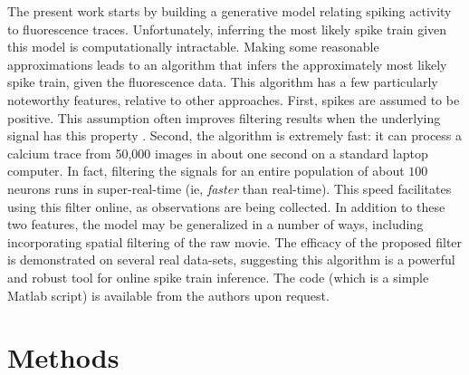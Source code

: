 The present work starts by building a generative model relating spiking activity to fluorescence traces. Unfortunately, inferring the most likely spike train given this model is computationally intractable.  Making some reasonable approximations leads to an algorithm that infers the approximately most likely spike train, given the fluorescence data.  This algorithm has a few particularly noteworthy features, relative to other approaches.  First, spikes are assumed to be positive.  This assumption often improves filtering results when the underlying signal has this property \cite{PortugalVicente94, MarkhamConchello99, LeeSeung99, LLS04, OGradyPearlmutter06, HuysPaninski06, Cunningham08, PaninskiWu09}.  Second, the algorithm is extremely fast: it can process a calcium trace from 50,000 images in about one second on a standard laptop computer. In fact, filtering the signals for an entire population of about $100$ neurons runs in super-real-time (ie, \emph{faster} than real-time). This speed facilitates using this filter online, as observations are being collected. In addition to these two features, the model may be generalized in a number of ways, including incorporating spatial filtering of the raw movie. The efficacy of the proposed filter is demonstrated on several real data-sets, suggesting this algorithm is a powerful and robust tool for online spike train inference.  The code (which is a simple Matlab script) is available from the authors upon request.







\section{Methods} \label{sec:methods}



